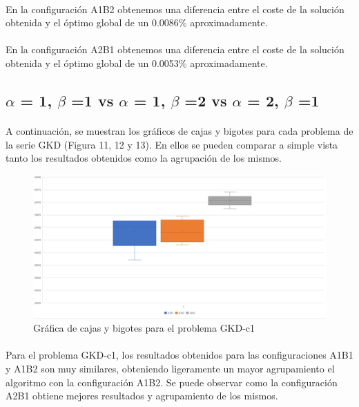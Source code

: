 	\paragraph{}En la configuración A1B2 obtenemos una diferencia entre el coste de la solución obtenida y el óptimo global de un 0.0086\% aproximadamente.
	
	\paragraph{}En la configuración A2B1 obtenemos una diferencia entre el coste de la solución obtenida y el óptimo global de un 0.0053\% aproximadamente.
	
	\newpage
	
	\subsection{$\alpha$ = 1, $\beta$ =1 vs $\alpha$ = 1, $\beta$ =2 vs $\alpha$ = 2, $\beta$ =1}
	
	\paragraph{}A continuación, se muestran los gráficos de cajas y bigotes para cada problema de la serie GKD (Figura 11, 12 y 13). En ellos se pueden comparar a simple vista tanto los resultados obtenidos como la agrupación de los mismos.
	
	\begin{figure}[H]
		\centering
		\includegraphics[scale=0.3]{img/BIGOTESGKD1.png}
		\caption{Gráfica de cajas y bigotes para el problema GKD-c1}
		\label{gkd-c1_bigotes}
	\end{figure}

	\paragraph{}Para el problema GKD-c1, los resultados obtenidos para las configuraciones A1B1 y A1B2 son muy similares, obteniendo ligeramente un mayor agrupamiento el algoritmo con la configuración A1B2. Se puede observar como la configuración A2B1 obtiene mejores resultados y agrupamiento de los mismos.

